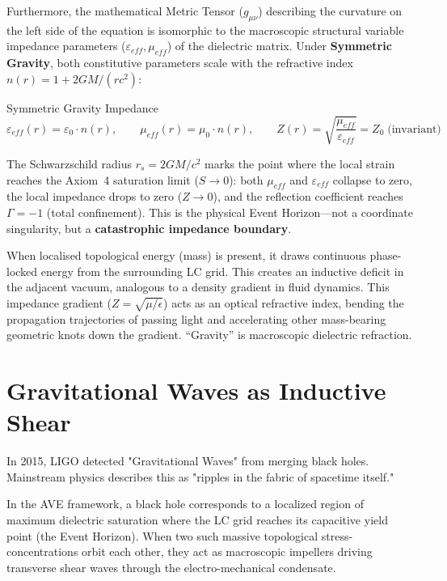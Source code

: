 Furthermore, the mathematical Metric Tensor ($g_{\mu\nu}$) describing the curvature on the left side of the equation is isomorphic to the macroscopic structural variable impedance parameters ($\varepsilon_{eff}, \mu_{eff}$) of the dielectric matrix. Under \textbf{Symmetric Gravity}, both constitutive parameters scale with the refractive index $n(r) = 1 + 2GM/(rc^2)$:
\begin{resultbox}{Symmetric Gravity Impedance}
\begin{equation}
    \varepsilon_{eff}(r) = \varepsilon_0 \cdot n(r), \qquad
    \mu_{eff}(r) = \mu_0 \cdot n(r), \qquad
    Z(r) = \sqrt{\frac{\mu_{eff}}{\varepsilon_{eff}}} = Z_0 \;\text{(invariant)}
\end{equation}
\end{resultbox}
The Schwarzschild radius $r_s = 2GM/c^2$ marks the point where the local strain reaches the Axiom~4 saturation limit ($S \to 0$): both $\mu_{eff}$ and $\varepsilon_{eff}$ collapse to zero, the local impedance drops to zero ($Z \to 0$), and the reflection coefficient reaches $\Gamma = -1$ (total confinement). This is the physical Event Horizon---not a coordinate singularity, but a \textbf{catastrophic impedance boundary}.

When localised topological energy (mass) is present, it draws continuous phase-locked energy from the surrounding LC grid. This creates an inductive deficit in the adjacent vacuum, analogous to a density gradient in fluid dynamics. This impedance gradient ($Z = \sqrt{\mu/\epsilon}$) acts as an optical refractive index, bending the propagation trajectories of passing light and accelerating other mass-bearing geometric knots down the gradient. ``Gravity'' is macroscopic dielectric refraction.

\section{Gravitational Waves as Inductive Shear}
In 2015, LIGO detected "Gravitational Waves" from merging black holes. Mainstream physics describes this as "ripples in the fabric of spacetime itself."

In the AVE framework, a black hole corresponds to a localized region of maximum dielectric saturation where the LC grid reaches its capacitive yield point (the Event Horizon). When two such massive topological stress-concentrations orbit each other, they act as macroscopic impellers driving transverse shear waves through the electro-mechanical condensate.

